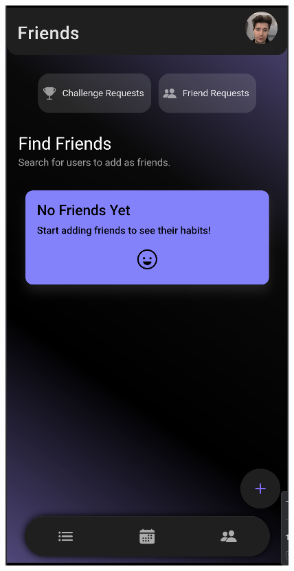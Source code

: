\documentclass[12pt]{report}
\begin{document}
\begin{figure}[H]
\begin{minipage}[b]{0.25\textwidth}
    \end{minipage}
    \hfill
    \begin{minipage}[b]{0.25\textwidth}
        \centering
        \includegraphics[width=\linewidth]{src/friends2.png}


\end{minipage}
\end{figure}
\end{document}
